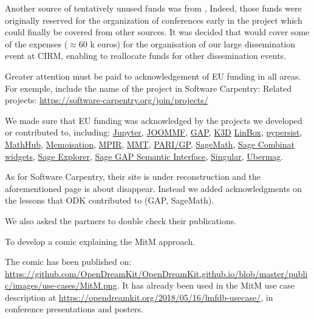 Another source of tentatively unused funds was from ,
Indeed, those funds were originally reserved for the organization of
conferences early in the project which could finally be covered from
other sources. It was decided that  would cover some of
the expenses ($\approx$60 k euros) for the organisation of our large
dissemination event at CIRM, enabling  to reallocate funds
for other dissemination events.

\begin{recommendation}
  Greater attention must be paid to acknowledgement of EU funding in
  all areas. For exemple, include the name of the project in Software
  Carpentry: Related projects:
  \url{https://software-carpentry.org/join/projects/}
\end{recommendation}

We made sure that EU funding was acknowledged by the projects we
developed or contributed to, including:
\href{https://jupyter.org/about}{Jupyter},
\href{http://joommf.github.io/}{JOOMMF},
\href{https://www.gap-system.org/Contacts/funding.html}{GAP},
\href{https://github.com/K3D-tools/K3D-jupyter}{K3D}
\href{https://linalg.org/support.html}{LinBox},
\href{https://pypersist.readthedocs.io/}{pypersist},
\href{https://mathhub.info/}{MathHub},
\href{https://gap-packages.github.io/Memoisation/}{Memoisation},
\href{http://www.mpir.org/news.html}{MPIR},
\href{https://uniformal.github.io//doc/}{MMT},
\href{https://pari.math.u-bordeaux.fr/funding.html}{PARI/GP},
\href{https://www.sagemath.org/development-ack.html}{SageMath},
\href{https://github.com/sagemath/sage-combinat-widgets}{Sage Combinat widgets},
\href{https://github.com/sagemath/sage-explorer}{Sage Explorer},
\href{https://github.com/nthiery/sage-gap-semantic-interface}{Sage GAP Semantic Interface},
\href{https://www.singular.uni-kl.de/index.php/background/funding.html}{Singular},
\href{https://ubermag.github.io/}{Ubermag}.

As for Software Carpentry, their site is under reconstruction and the
aforementioned page is about disappear. Instead we added
acknowledgments on the lessons that ODK contributed to (GAP,
SageMath).

We also asked the partners to double check their publications.


\begin{recommendation}
  To develop a comic explaining the MitM approach.
\end{recommendation}
The comic has been published on:
\url{https://github.com/OpenDreamKit/OpenDreamKit.github.io/blob/master/public/images/use-cases/MitM.png}. It
has already been used in the MitM use case description at
\url{https://opendreamkit.org/2018/05/16/lmfdb-usecase/}, in conference presentations and
posters.

